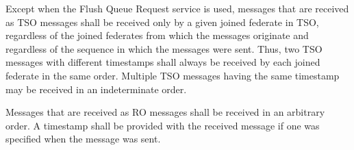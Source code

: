 \begin{compactstdpage}
    Except when the Flush Queue Request service is used, messages that are received as TSO messages shall be received only by a given joined federate in TSO, regardless of the joined federates from which the messages originate and regardless of the sequence in which the messages were sent. Thus, two TSO messages with different timestamps shall always be received by each joined federate in the same order. Multiple TSO messages having the same timestamp may be received in an indeterminate order.

    Messages that are received as RO messages shall be received in an arbitrary order. A timestamp shall be provided with the received message if one was specified when the message was sent.


\end{compactstdpage}

\clearpage

